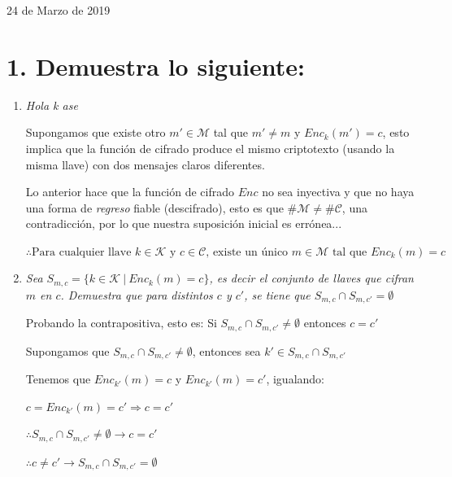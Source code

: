 \documentclass[11pt]{article}
\begin{document}
\begin{center}
        \vspace{2cm}
        \begin{center}
            {\large 24 de Marzo de 2019}
        \end{center}                                                             
    \end{center}

    \newpage
    
    \allowdisplaybreaks
    
    \section*{1. Demuestra lo siguiente:}
        \begin{enumerate}[label=\alph*)]
            \item \textit{Hola k ase}
            
            Supongamos que existe otro $ m' \in \mathcal{M} $ tal que $ m' \neq m $ y $ Enc_{k}(m') = c $, esto implica que la función de cifrado produce el mismo criptotexto (usando la misma llave) con dos mensajes claros diferentes.
            
            Lo anterior hace que la función de cifrado $ Enc $ no sea inyectiva y que no haya una forma de \textit{regreso} fiable (descifrado), esto es que $ \#\mathcal{M} \neq \#\mathcal{C} $, una contradicción, por lo que nuestra suposición inicial es errónea...
            
            $ \therefore \text{Para cualquier llave } k \in \mathcal{K} \text{ y } c \in \mathcal{C} \text{, existe un único } m \in \mathcal{M} \text{ tal que } Enc_{k}(m) = c $
            
            \item \textit{Sea $ S_{m,c} = \{k \in \mathcal{K}\ |\ Enc_{k}(m) = c\} $, es decir el conjunto de llaves que cifran $ m $ en $ c $. Demuestra que para distintos $ c $ y $ c' $, se tiene que $ S_{m, c} \cap S_{m, c'} = \emptyset $}
            
            Probando la contrapositiva, esto es: Si $ S_{m, c} \cap S_{m, c'} \neq \emptyset $ entonces $ c = c' $
            
            Supongamos que $ S_{m, c} \cap S_{m, c'} \neq \emptyset $, entonces sea $ k' \in  S_{m, c} \cap S_{m, c'} $
            
            Tenemos que $ Enc_{k'}(m) = c $ y $ Enc_{k'}(m) = c' $, igualando:
            
            $ c = Enc_{k'}(m) = c' \Rightarrow c = c' $
            
            $ \therefore S_{m, c} \cap S_{m, c'} \neq \emptyset \rightarrow c = c'$
            
            $ \therefore c \neq c' \rightarrow S_{m, c} \cap S_{m, c'} = \emptyset $
            
        \end{enumerate}
    
\end{document}
